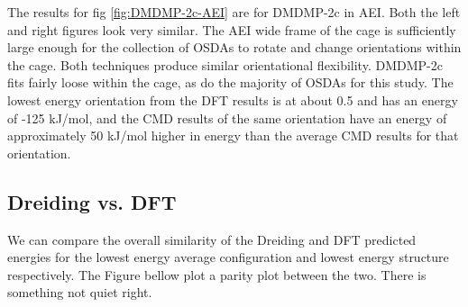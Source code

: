 \documentclass[journal=accacs,manuscript=article, email=true, layout=traditional]{achemso}
\begin{document}
The results for fig \ref{fig:DMDMP-2c-AEI} are for DMDMP-2c in AEI. Both the left and right figures look very similar. The AEI wide frame of the cage is sufficiently large enough for the collection of OSDAs to rotate and change orientations within the cage. Both techniques produce similar orientational flexibility. DMDMP-2c fits fairly loose within the cage, as do the majority of OSDAs for this study. The lowest energy orientation from the DFT results is at about 0.5 and has an energy of -125 kJ/mol, and the CMD results of the same orientation have an energy of approximately 50 kJ/mol higher in energy than the average CMD results for that orientation. 

\subsection{Dreiding vs. DFT}
\label{sec:org3c36611}
We can compare the overall similarity of the Dreiding and DFT predicted energies for the lowest energy average configuration and lowest energy structure respectively. The Figure bellow plot a parity plot between the two. There is something not quiet right.
\end{document}
